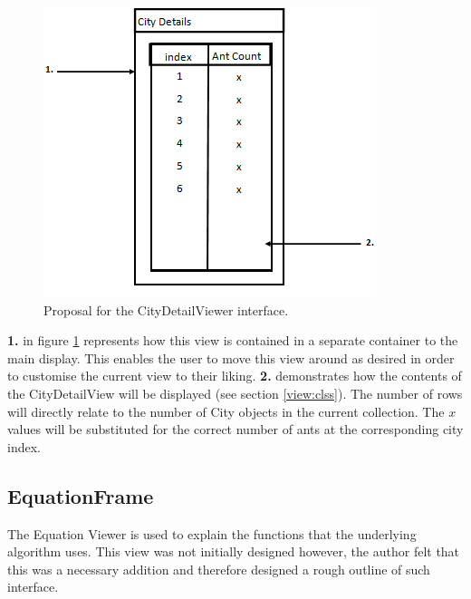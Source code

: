 \begin{figure}[H]
\centering
\includegraphics[scale=0.7]{Images/chapter4/citydetails}
\caption[CityDetailViewer Design]{Proposal for the CityDetailViewer interface.}
\label{fig:deetzViewImp}
\end{figure}

\textbf{1.} in figure \ref{fig:deetzViewImp} represents how this view is contained in a separate container to the main display. This enables the user to move this view around as desired in order to customise the current view to their liking. \textbf{2.} demonstrates how the contents of the CityDetailView will be displayed (see section \ref{view:clss}). The number of rows will directly relate to the number of City objects in the current collection. The $x$ values will be substituted for the correct number of ants at the corresponding city index.

\subsection{EquationFrame}
\label{eqnlview}

The Equation Viewer is used to explain the functions that the underlying algorithm uses. This view was not initially designed however, the author felt that this was a necessary addition and therefore designed a rough outline of such interface.

